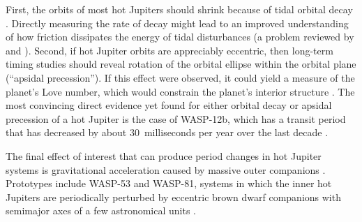 \documentclass[12pt,twocolumn,tighten]{aastex62}
\begin{document}
First, the orbits of most hot Jupiters should shrink because of tidal
orbital decay
\citep{counselman_outcomes_1973,hut_stability_1980,levrard_falling_2009,matsumura_tidal_2010}.
Directly measuring the rate of decay might lead to an improved
understanding of how friction dissipates the energy of tidal
disturbances (a problem reviewed by \citealt{Mazeh2008} and
\citealt{ogilvie_tidal_2014}). Second, if hot Jupiter orbits are
appreciably eccentric, then long-term timing studies should reveal
rotation of the orbital ellipse within the orbital plane (``apsidal
precession'').  If this effect were observed, it could yield a measure
of the planet's Love number, which would constrain the planet's
interior structure \citep{ragozzine_probing_2009}.  The most
convincing direct evidence yet found for either orbital decay or
apsidal precession of a hot Jupiter is the case of WASP-12b, which has
a transit period that has decreased by about 30~milliseconds per year
over the last decade \citep{maciejewski_departure_2016,patra_2017}.

The final effect of interest that can produce period changes in hot
Jupiter systems is gravitational acceleration caused by massive outer
companions \citep[{\it e.g.},][Section~4]{agol_detecting_2005}.
Prototypes include WASP-53 and WASP-81, systems in which the inner hot
Jupiters are periodically perturbed by eccentric brown dwarf
companions with semimajor axes of a few astronomical units
\citep{triaud_peculiar_2017}.
\end{document}
